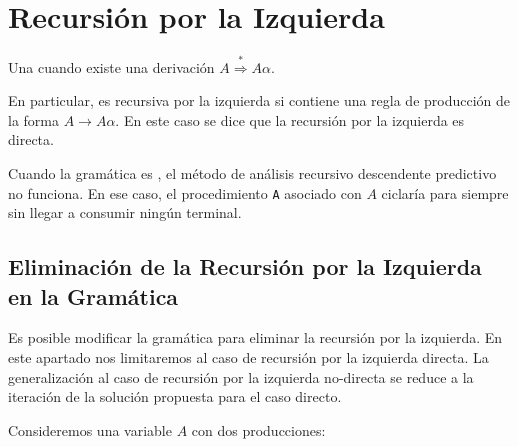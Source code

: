 % 

\section{Recursión por la Izquierda}
\label{section:recursionizquierda}

\begin{definition}
Una  cuando existe una derivación
$A \stackrel{*}{\Longrightarrow} A \alpha$. 

En particular, es recursiva por la izquierda si contiene
una regla de producción de la forma $A \rightarrow A \alpha$. 
En este caso se dice que la recursión por la izquierda es directa.
\end{definition}

Cuando la gramática es , 
el método 
de análisis recursivo descendente predictivo no funciona. 
En ese caso, el procedimiento
\verb|A| asociado con $A$ ciclaría para siempre sin llegar a consumir ningún 
terminal. 

\subsection{Eliminación de la Recursión por la Izquierda en la Gramática}
\label{subsection:eliminaleftrec}
Es posible modificar la gramática para eliminar la recursión por 
la izquierda. En este apartado nos limitaremos al caso de recursión 
por la izquierda directa. 
La generalización al caso de recursión por la izquierda no-directa
se reduce a la iteración de la solución propuesta 
para el caso directo.

Consideremos una variable $A$ con dos producciones:

